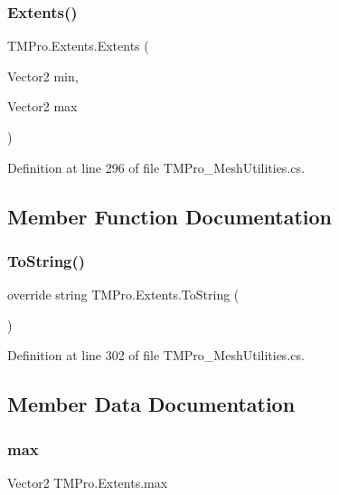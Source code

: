 \subsubsection{\texorpdfstring{Extents()}{Extents()}}
{\footnotesize\ttfamily T\+M\+Pro.\+Extents.\+Extents (\begin{DoxyParamCaption}\item[{Vector2}]{min,  }\item[{Vector2}]{max }\end{DoxyParamCaption})}



Definition at line 296 of file T\+M\+Pro\+\_\+\+Mesh\+Utilities.\+cs.



\subsection{Member Function Documentation}
\mbox{\label{struct_t_m_pro_1_1_extents_af4dd4e8effac8721fb5b27e5af9a3574}} 
\subsubsection{\texorpdfstring{ToString()}{ToString()}}
{\footnotesize\ttfamily override string T\+M\+Pro.\+Extents.\+To\+String (\begin{DoxyParamCaption}{ }\end{DoxyParamCaption})}



Definition at line 302 of file T\+M\+Pro\+\_\+\+Mesh\+Utilities.\+cs.



\subsection{Member Data Documentation}
\mbox{\label{struct_t_m_pro_1_1_extents_a4eab903aebb23dbbb53be3c41bafbff9}} 
\subsubsection{\texorpdfstring{max}{max}}
{\footnotesize\ttfamily Vector2 T\+M\+Pro.\+Extents.\+max}



